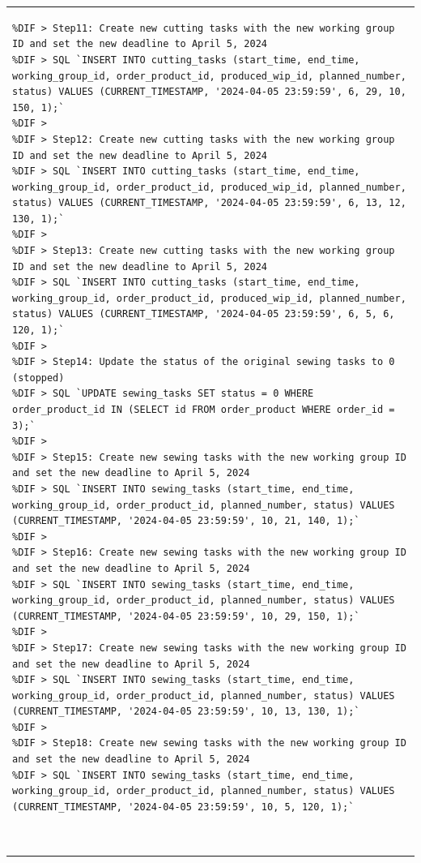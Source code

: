 \documentclass[preprint,12pt]{elsarticle}
\providecommand{\DIFmodbegin}{} %
\providecommand{\DIFmodend}{} %
\begin{document}
\begin{center}
\begin{longtable}{p{390pt}}
\begin{lstlisting}[style=my_operation, label={lst:chain_of_operation},alsolanguage=DIFcode]
%DIF > 
%DIF > Step11: Create new cutting tasks with the new working group ID and set the new deadline to April 5, 2024
%DIF > SQL `INSERT INTO cutting_tasks (start_time, end_time, working_group_id, order_product_id, produced_wip_id, planned_number, status) VALUES (CURRENT_TIMESTAMP, '2024-04-05 23:59:59', 6, 29, 10, 150, 1);`
%DIF > 
%DIF > Step12: Create new cutting tasks with the new working group ID and set the new deadline to April 5, 2024
%DIF > SQL `INSERT INTO cutting_tasks (start_time, end_time, working_group_id, order_product_id, produced_wip_id, planned_number, status) VALUES (CURRENT_TIMESTAMP, '2024-04-05 23:59:59', 6, 13, 12, 130, 1);`
%DIF > 
%DIF > Step13: Create new cutting tasks with the new working group ID and set the new deadline to April 5, 2024
%DIF > SQL `INSERT INTO cutting_tasks (start_time, end_time, working_group_id, order_product_id, produced_wip_id, planned_number, status) VALUES (CURRENT_TIMESTAMP, '2024-04-05 23:59:59', 6, 5, 6, 120, 1);`
%DIF > 
%DIF > Step14: Update the status of the original sewing tasks to 0 (stopped)
%DIF > SQL `UPDATE sewing_tasks SET status = 0 WHERE order_product_id IN (SELECT id FROM order_product WHERE order_id = 3);`
%DIF > 
%DIF > Step15: Create new sewing tasks with the new working group ID and set the new deadline to April 5, 2024
%DIF > SQL `INSERT INTO sewing_tasks (start_time, end_time, working_group_id, order_product_id, planned_number, status) VALUES (CURRENT_TIMESTAMP, '2024-04-05 23:59:59', 10, 21, 140, 1);`
%DIF > 
%DIF > Step16: Create new sewing tasks with the new working group ID and set the new deadline to April 5, 2024
%DIF > SQL `INSERT INTO sewing_tasks (start_time, end_time, working_group_id, order_product_id, planned_number, status) VALUES (CURRENT_TIMESTAMP, '2024-04-05 23:59:59', 10, 29, 150, 1);`
%DIF > 
%DIF > Step17: Create new sewing tasks with the new working group ID and set the new deadline to April 5, 2024
%DIF > SQL `INSERT INTO sewing_tasks (start_time, end_time, working_group_id, order_product_id, planned_number, status) VALUES (CURRENT_TIMESTAMP, '2024-04-05 23:59:59', 10, 13, 130, 1);`
%DIF > 
%DIF > Step18: Create new sewing tasks with the new working group ID and set the new deadline to April 5, 2024
%DIF > SQL `INSERT INTO sewing_tasks (start_time, end_time, working_group_id, order_product_id, planned_number, status) VALUES (CURRENT_TIMESTAMP, '2024-04-05 23:59:59', 10, 5, 120, 1);`
\end{lstlisting}
\DIFmodend\\ 
\DIFmodbegin
\begin{lstlisting}[style=my_operation, label={lst:chain_of_operation},alsolanguage=DIFcode]

\end{lstlisting}
\end{longtable}
\end{center}
\end{document}
